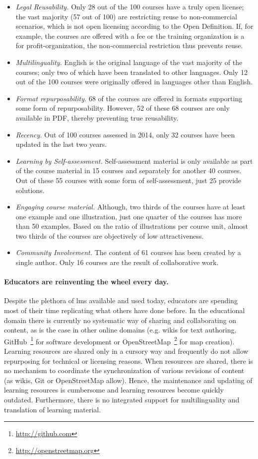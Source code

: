 \documentclass[PhD, Submit, ngerman,UKenglish,table]{scrbook}
\begin{document}
\begin{itemize}
\item \emph{Legal Reusability.} Only 28 out of the 100 courses have a truly open license; the vast majority (57 out of 100) are restricting reuse to non-commercial scenarios, which is not open licensing according to the Open Definition.
If, for example, the courses are offered with a fee or the training organization is a for profit-organization, the non-commercial restriction thus prevents reuse.
\item \emph{Multilinguality.} English is the original language of the vast majority of the courses; only two of which have been translated to other languages.
Only 12 out of the 100 courses were originally offered in languages other than English. 
\item \emph{Format repurposability.} 68 of the courses are offered in formats supporting some form of repurposability. However, 52 of these 68 courses are only available in PDF, thereby preventing true reusability.
\item \emph{Recency.} Out of 100 courses assessed in 2014, only 32 courses have been updated in the last two years.
\item \emph{Learning by Self-assessment.} Self-assessment material is only available as part of the course material in 15 courses and separately for another 40 courses.
Out of these 55 courses with some form of self-assessment, just 25 provide solutions.
\item \emph{Engaging course material.} Although, two thirds of the courses have at least one example and one illustration, just one quarter of the courses has more than 50 examples.
Based on the ratio of illustrations per course unit, almost two thirds of the courses are objectively of low attractiveness.
\item \emph{Community Involvement.} The content of 61 courses has been created by a single author. Only 16 courses are the result of collaborative work.
\end{itemize}

\paragraph{Educators are reinventing the wheel every day.}
Despite the plethora of \gls{lms} available and used today, educators are spending most of their time replicating what others have done before.
In the educational domain there is currently no systematic way of sharing and collaborating on content, as is the case in other online domains (e.g. wikis for text authoring, GitHub~\footnote{\url{http://github.com}} for software development or OpenStreetMap~\footnote{\url{http://openstreetmap.org}} for map creation).
Learning resources are shared only in a cursory way and frequently do not allow repurposing for technical or licensing reasons.
When resources are shared, there is no mechanism to coordinate the synchronization of various revisions of content (as wikis, Git or OpenStreetMap allow).
Hence, the maintenance and updating of learning resources is cumbersome and learning resources become quickly outdated.
Furthermore, there is no integrated support for multilinguality and translation of learning material.
\end{document}

